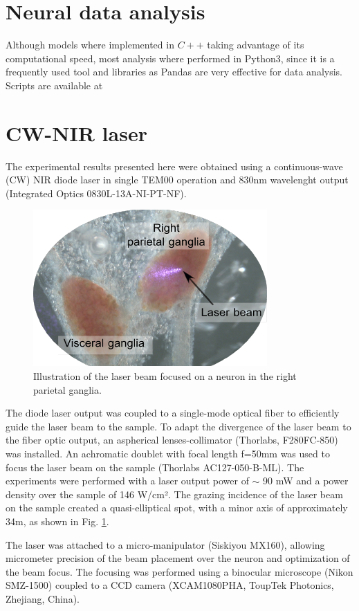  
\section{Neural data analysis}
Although models where implemented in $C++$ taking advantage of its computational speed, most analysis where performed in Python3, since it is a frequently used tool and libraries as Pandas are very effective for data analysis. 
Scripts are available at 

\section{CW-NIR laser}
The experimental results presented here were obtained using a continuous-wave (CW) NIR diode laser in single TEM00 operation and 830nm wavelenght output (Integrated Optics 0830L-13A-NI-PT-NF). \begin{figure}
	\includegraphics{img/laser/laser-beam.pdf}
	\caption{Illustration of the laser beam focused on a neuron in the right parietal ganglia.}
	\label{fig:laser beam}
\end{figure} 
The diode laser output was coupled to a single-mode optical fiber to efficiently guide the laser beam to the sample. To adapt the divergence of the laser beam to the fiber optic output, an aspherical lenses-collimator (Thorlabs, F280FC-850) was installed. An achromatic doublet with focal length f=50mm was used to focus the laser beam on the sample (Thorlabs AC127-050-B-ML). The experiments were performed with a laser output power of $\sim$ 90 mW and a power density over the sample of 146 W/cm². The grazing incidence of the laser beam on the sample created a quasi-elliptical spot, with a minor axis of approximately 34{\textmu}m, as shown in Fig. \ref{fig:laser beam}.



The laser was attached to a micro-manipulator (Siskiyou MX160), allowing micrometer precision of the beam placement over the neuron and optimization of the beam focus. The focusing was performed using a binocular microscope (Nikon SMZ-1500) coupled to a CCD camera (XCAM1080PHA, ToupTek Photonics, Zhejiang, China).


